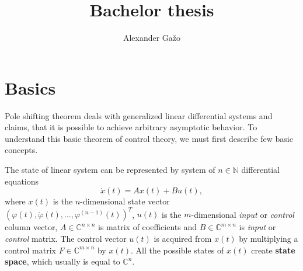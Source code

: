 \documentclass[12pt,a4paper]{report}
\title{\vspace*{70mm}Bachelor thesis}
\author{Alexander Gažo}
\newcommand{\N}{\mathbb{N}}
\newcommand{\C}{\mathbb{C}}
\begin{document}
\maketitle
\thispagestyle{empty} %
\pagebreak

\tableofcontents
\pagebreak

\section{Basics}
\label{sec:basics}

Pole shifting theorem deals with generalized linear differential systems and claims, that it is possible to achieve arbitrary asymptotic behavior. To understand this basic theorem of control theory, we must first describe few basic concepts.

The state of linear system can be represented by system of $n\in \N$ differential equations $$\dot{x}(t)=Ax(t)+Bu(t),$$ where $x(t)$ is the $n$-dimensional state vector $(\varphi(t),\dot{\varphi}(t),\ldots,\varphi^{(n-1)}(t))^T$, $u(t)$ is the $m$-dimensional \textit{input} or \textit{control} column vector, $A \in \C ^{n\times n}$ is matrix of coefficients and $B\in \C ^{m\times n}$ is \textit{input} or \textit{control} matrix. The control vector $u(t)$ is acquired from $x(t)$ by multiplying a control matrix $F\in \C ^{m\times n}$ by $x(t)$. All the possible states of $x(t)$ create \textbf{state space}, which usually is equal to $\C^n$. 
\end{document}
